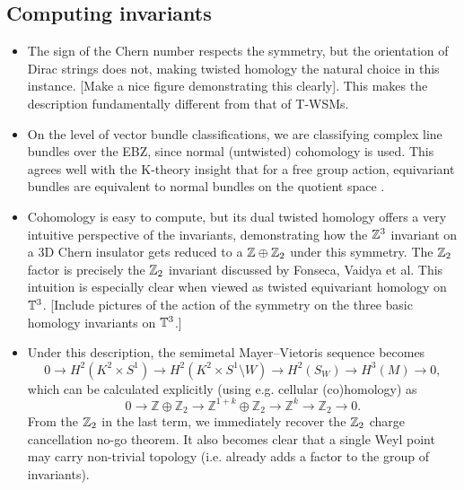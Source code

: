 \subsection{Computing invariants}



{\color{blue}
\begin{itemize}	
	\item The sign of the Chern number respects the symmetry, but the orientation of Dirac strings does not, making twisted homology the natural choice in this instance. [Make a nice figure demonstrating this clearly]. This makes the description fundamentally different from that of T-WSMs.
	
	\item On the level of vector bundle classifications, we are classifying complex line bundles over the EBZ, since normal (untwisted) cohomology is used. This agrees well with the K-theory insight that for a free group action, equivariant bundles are equivalent to normal bundles on the quotient space .
	
	\item Cohomology is easy to compute, but its dual twisted homology offers a very intuitive perspective of the invariants, demonstrating how the $\mathbb{Z}^3$ invariant on a 3D Chern insulator gets reduced to a $\mathbb{Z}\oplus\mathbb{Z}_2$ under this symmetry. The $\mathbb{Z}_2$ factor is precisely the $\mathbb{Z}_2$ invariant discussed by Fonseca, Vaidya et al. This intuition is especially clear when viewed as twisted equivariant homology on $\mathbb{T}^3$. [Include pictures of the action of the symmetry on the three basic homology invariants on $\mathbb{T}^3$.]
	
	\item Under this description, the semimetal Mayer--Vietoris sequence becomes
	\begin{equation*}
		0\to H^2(K^2\times S^1) \to H^2(K^2\times S^1\setminus W) \to H^2(S_W) \to H^3(M) \to 0,
	\end{equation*}
	which can be calculated explicitly (using e.g. cellular (co)homology) as
	\begin{equation*}
		0\to \mathbb{Z}\oplus\mathbb{Z}_2 \to \mathbb{Z}^{1+k}\oplus\mathbb{Z}_2 \to \mathbb{Z}^k \to \mathbb{Z}_2 \to 0.
	\end{equation*}
	From the $\mathbb{Z}_2$ in the last term, we immediately recover the $\mathbb{Z}_2$ charge cancellation no-go theorem. It also becomes clear that a single Weyl point may carry non-trivial topology (i.e. already adds a factor to the group of invariants).
\end{itemize}

}
